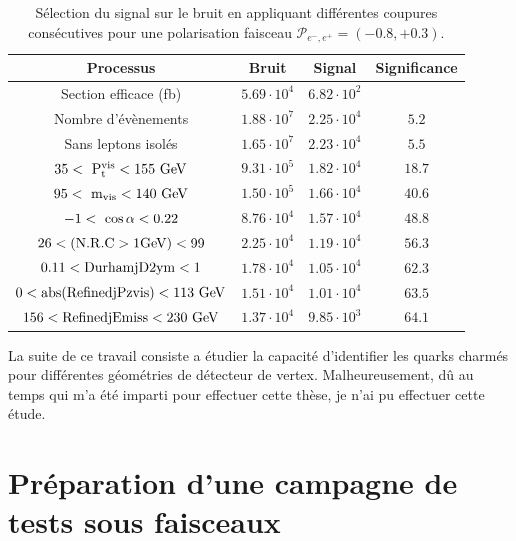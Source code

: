     \begin{table}
    \begin{tabular}{c c c c}
      \hline
      Processus                                     & Bruit        & Signal              & Significance  \tabularnewline
      \hline
      \hline
      Section efficace (fb)                          & $5.69 \cdot 10^{4}$ & $6.82 \cdot 10^{2}$ &               \tabularnewline
      Nombre d'évènements                       & $1.88 \cdot 10^{7}$ & $2.25 \cdot 10^{4}$ & $5.2$         \tabularnewline
      Sans leptons isolés                         & $1.65 \cdot 10^{7}$ & $2.23 \cdot 10^{4}$ & $5.5$         \tabularnewline
      {$35 <~\rm{{P}_{t}^{vis}} < 155~\rm{GeV} $} & $9.31 \cdot 10^{5}$ & $1.82 \cdot 10^{4}$ & $18.7$        \tabularnewline
      {$95 <~\rm{m_{vis}}< 140~\rm{GeV}$}         & $1.50 \cdot 10^{5}$ & $1.66 \cdot 10^{4}$ & $40.6$        \tabularnewline
      {$-1 <~\rm{\cos{\alpha}}< 0.22$}            & $8.76 \cdot 10^{4}$ & $1.57 \cdot 10^{4}$ & $48.8$        \tabularnewline
      $26 < (\rm{N.R.C > 1GeV}) < 99$                    & $2.25 \cdot 10^{4}$ & $1.19 \cdot 10^{4}$ & $56.3$        \tabularnewline
      $0.11 < \rm{DurhamjD2ym} < 1$               & $1.78 \cdot 10^{4}$ & $1.05 \cdot 10^{4}$ & $62.3$        \tabularnewline
      $0 < \rm{abs(RefinedjPzvis)} < 113~\rm{GeV}$& $1.51 \cdot 10^{4}$ & $1.01 \cdot 10^{4}$ & $63.5$        \tabularnewline
      $156 < \rm{RefinedjEmiss} < 230~\rm{GeV}$   & $1.37 \cdot 10^{4}$ & $9.85 \cdot 10^{3}$ & $64.1$        \tabularnewline      
    \end{tabular}
    \caption{Sélection du signal sur le bruit en appliquant différentes coupures consécutives pour une polarisation faisceau $\mathcal{P}_{e^{-},e^{+}} = (-0.8, +0.3)$.}
    \label{tab:cutFlow_resume}
  \end{table}



  La suite de ce travail consiste a étudier la capacité d'identifier les quarks charmés pour différentes géométries de détecteur de vertex. 
  Malheureusement, dû au temps qui m'a été imparti pour effectuer cette thèse, je n'ai pu effectuer cette étude.

  \section{Préparation d'une campagne de tests sous faisceaux}

